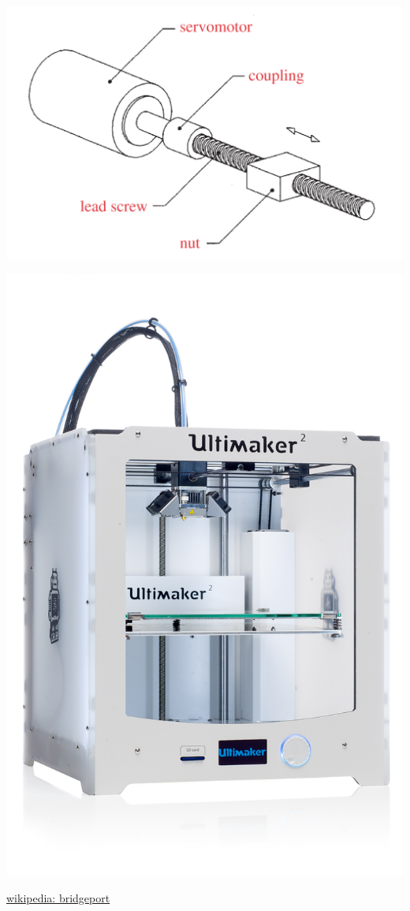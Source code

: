 \documentclass[fleqn]{beamer} %
\begin{document}
\begin{frame}[label=sectionI]
\begin{multicols}{3}
			\includegraphics[scale=0.1]{images/figure_15_5.png}

			\includegraphics[scale=0.15]{images/Ultimaker_2.png}
		
		\end{multicols}

		\href{https://en.wikipedia.org/wiki/Bridgeport_(machine_tool_brand)\#/media/File:Sharp_3_Axis_Vertical_Mill_Full_View.jpg}{wikipedia: bridgeport}
	
	\end{frame}
\end{document}
